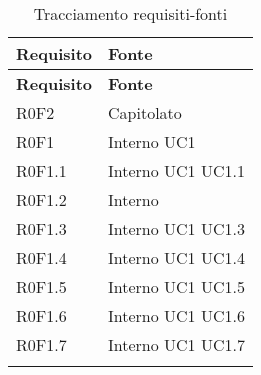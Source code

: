 \def\arraystretch{1.5}
\begin{longtable}{p{2.5cm}!{\VRule[1pt]}p{2.5cm}}
\color{white} \textbf{Requisito} & \color{white} \textbf{Fonte} \\ 
\endfirsthead 
{} 
\color{white} \textbf{Requisito} & \color{white} \textbf{Fonte} \\ 
\endhead 
R0F2 & Capitolato \\
R0F1 & Interno \newline UC1
 \\
R0F1.1 & Interno \newline UC1
 \newline UC1.1
 \\
R0F1.2 & Interno \\
R0F1.3 & Interno \newline UC1
 \newline UC1.3
 \\
R0F1.4 & Interno \newline UC1
 \newline UC1.4
 \\
R0F1.5 & Interno \newline UC1
 \newline UC1.5
 \\
R0F1.6 & Interno \newline UC1
 \newline UC1.6
 \\
R0F1.7 & Interno \newline UC1
 \newline UC1.7
 \\
\caption{Tracciamento requisiti-fonti}
\end{longtable}